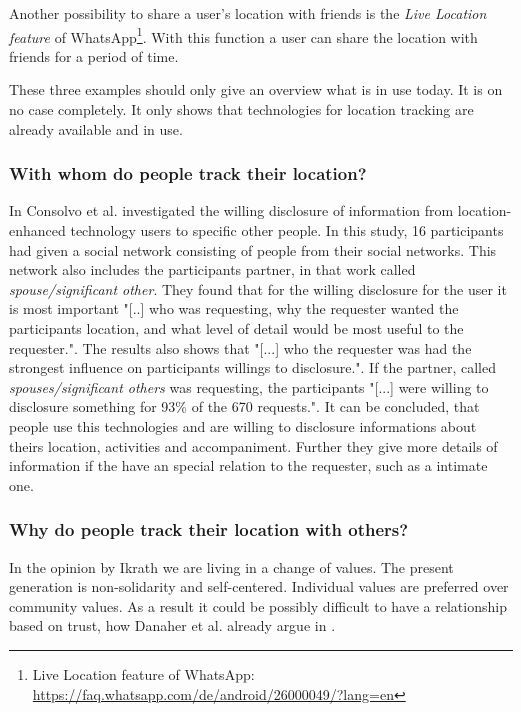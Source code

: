 Another possibility to share a user's location with friends is the \textit{Live Location feature} of WhatsApp\footnote{Live Location feature of WhatsApp: \url{https://faq.whatsapp.com/de/android/26000049/?lang=en}}. With this function a user can share the location with friends for a period of time.

These three examples should only give an overview what is in use today. It is on no case completely. It only shows that technologies for location tracking are already available and in use.

\subsubsection{With whom do people track their location?}
In \cite{Consolvo:2005:LDS:1054972.1054985} Consolvo et al. investigated the willing disclosure of information from location-enhanced technology users to specific other people. In this study, 16 participants had given a social network consisting of people from their social networks. This network also includes the participants partner, in that work called \textit{spouse/significant other}. They found that for the willing disclosure for the user it is most important "[..] who was requesting, why the requester wanted the participants location, and what level of detail would be most useful to the requester.". The results also shows that "[...] who the requester was had the strongest influence on participants willings to disclosure.". If the partner, called \textit{spouses/significant others} was requesting, the participants "[...] were willing to disclosure something for 93\% of the 670 requests.".
It can be concluded, that people use this technologies and are willing to disclosure informations about theirs location, activities and accompaniment. Further they give more details of information if the have an special relation to the requester, such as a intimate one.

\subsubsection{Why do people track their location with others?}

In the opinion by Ikrath \cite{Ikrath2018} we are living in a change of values. The present generation is non-solidarity and self-centered. Individual values are preferred over community values.  
As a result it could be possibly difficult to have a relationship based on trust, how Danaher et al. already argue in \cite{doi:10.1080/15265161.2017.1409823}.

